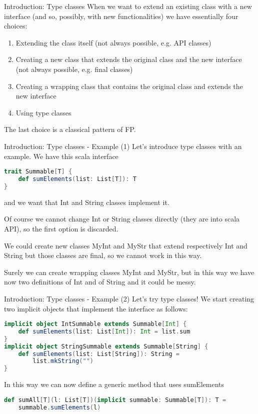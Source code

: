 \begin{frame}{Introduction: Type classes}
	When we want to extend an existing class with a new interface 
	(and so, possibly, with new functionalities) we have essentially four choices:	
	\begin{enumerate}[<+->]
		\item Extending the class itself (not always possible, e.g. API classes)
		\item Creating a new class that extends the original class and the new interface (not always possible, e.g. final classes)
		\item Creating a wrapping class that contains the original class and extends the new interface
		\item Using type classes
	\end{enumerate}
	\pause[4]
	The last choice is a classical pattern of FP.			
\end{frame}

\begin{frame}[fragile]{Introduction: Type classes - Example (1)}
	Let's introduce type classes with an example.
	We have this scala interface
\begin{lstlisting}[language=scala]
trait Summable[T] {
	def sumElements(list: List[T]): T
}
\end{lstlisting}
	and we want that Int and String classes implement it.

	\pause

	Of course we cannot change Int or String classes directly (they are into scala API), so the first option is discarded.
	
	\pause
	
	We could create new classes MyInt and MyStr that extend respectively Int and String but those classes are final, so we cannot work in 
	this way.
	
	\pause
	
	Surely we can create wrapping classes MyInt and MyStr, but in this way we have now two definitions of Int and of String and 
	it could be messy.
\end{frame}

\begin{frame}[fragile]{Introduction: Type classes - Example (2)}	
	Let's try type classes!
	We start creating two implicit objects that implement the interface as follows:
\begin{lstlisting}[language=scala]
implicit object IntSummable extends Summable[Int] {
	def sumElements(list: List[Int]): Int = list.sum
}
implicit object StringSummable extends Summable[String] {
	def sumElements(list: List[String]): String = 
		list.mkString("")
}
\end{lstlisting}

	\pause

	In this way we can now define a generic method that uses sumElements
\begin{lstlisting}[language=scala]
def sumAll[T](l: List[T])(implicit summable: Summable[T]): T =
	summable.sumElements(l)		
\end{lstlisting}	
\end{frame}

